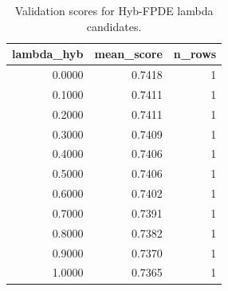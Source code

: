 \begin{table}[t]
\caption{Validation scores for Hyb-FPDE lambda candidates.}
\label{tab:lambda_distribution_computed}
\centering
\begin{tabular}{rrr}
\toprule
lambda\_hyb & mean\_score & n\_rows \\
\midrule
0.0000 & 0.7418 & 1 \\
0.1000 & 0.7411 & 1 \\
0.2000 & 0.7411 & 1 \\
0.3000 & 0.7409 & 1 \\
0.4000 & 0.7406 & 1 \\
0.5000 & 0.7406 & 1 \\
0.6000 & 0.7402 & 1 \\
0.7000 & 0.7391 & 1 \\
0.8000 & 0.7382 & 1 \\
0.9000 & 0.7370 & 1 \\
1.0000 & 0.7365 & 1 \\
\bottomrule
\end{tabular}

\end{table}
